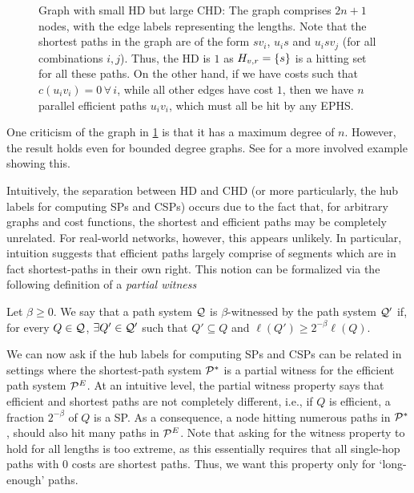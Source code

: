 \begin{figure}
	
	\caption{Graph with small HD but large CHD: The graph comprises $2n+1$ nodes, with the edge labels representing the lengths. Note that the shortest paths in the graph are of the form $sv_i$, $u_is$ and $u_isv_j$ (for all combinations $i,j$). Thus, the HD is $1$ as $H_{v,r}=\{s\}$ is a hitting set for all these paths. On the other hand, if we have costs such that $c(u_iv_i)=0\,\forall\,i$, while all other edges have cost $1$, then we have $n$ parallel efficient paths $u_iv_i$, which must all be hit by any EPHS.}
	\label{fig:big_chd}
\end{figure}

\begin{remark}
	One criticism of the graph in \cref{fig:big_chd} is that it has a maximum degree of $n$.
	However, the result holds even for bounded degree graphs.
	See \cite{TechReport} for a more involved example showing this.
\end{remark}

Intuitively, the separation between HD and CHD (or more particularly, the hub labels for computing SPs and CSPs) occurs due to the fact that, for arbitrary graphs and cost functions, the shortest and efficient paths may be completely unrelated. 
For real-world networks, however, this appears unlikely.
In particular, intuition suggests that efficient paths largely comprise of segments which are in fact shortest-paths in their own right. 
This notion can be formalized via the following definition of a \emph{partial witness} 
\begin{definition}
	Let $\beta\geq 0$.
	We say that a path system $\mathcal{Q}$ is $\beta$-witnessed by the path system $\mathcal{Q}'$ if, for every $Q\in\mathcal{Q}$, $\exists Q'\in\mathcal{Q}'$ such that $Q'\subseteq Q$ and $\ell(Q')\geq 2^{-\beta}\ell(Q)$.
\end{definition}
We can now ask if the hub labels for computing SPs and CSPs can be related in settings where the shortest-path system $\mathcal{P}^*$ is a partial witness for the efficient path system $\mathcal{P}^E$.
At an intuitive level, the partial witness property says that efficient and shortest paths are not completely different, i.e., if $Q$ is efficient, a fraction $2^{-\beta}$ of $Q$ is a SP.
As a consequence, a node hitting numerous paths in $\mathcal{P}^*$, should also hit many paths in $\mathcal{P}^E$.
Note that asking for the witness property to hold for all lengths is too extreme, as this essentially requires that all single-hop paths with 0 costs are shortest paths.
Thus, we want this property only for `long-enough' paths. 

